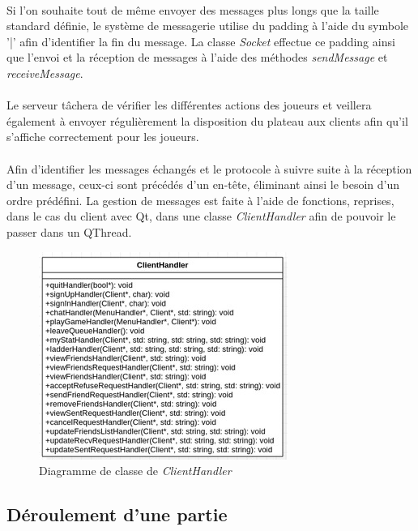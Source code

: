 \documentclass[10pt, a4paper]{article}
\begin{document}
\paragraph{}Si l'on souhaite tout de même envoyer des messages plus longs que la taille standard définie, le système de messagerie utilise du padding à l'aide du symbole '|' afin d'identifier la fin du message. La classe \textit{Socket} effectue ce padding ainsi que l'envoi et la réception de messages à l'aide des méthodes \textit{sendMessage} et \textit{receiveMessage}.
\paragraph{}Le serveur tâchera de vérifier les différentes actions des joueurs et veillera également à envoyer régulièrement la disposition du plateau aux clients afin qu'il s'affiche correctement pour les joueurs.
\paragraph{}Afin d'identifier les messages échangés et le protocole à suivre suite à la réception d'un message, ceux-ci sont précédés d'un en-tête, éliminant ainsi le besoin d'un ordre prédéfini. La gestion de messages est faite à l'aide de fonctions, reprises, dans le cas du client avec Qt, dans une classe \textit{ClientHandler} afin de pouvoir le passer dans un QThread.

\begin{figure}[H]
\centering
\includegraphics[scale=0.72]{diagram_clienthandler.jpg}
\caption{Diagramme de classe de \textit{ClientHandler}}
\end{figure}

\subsection{Déroulement d'une partie}
\end{document}
